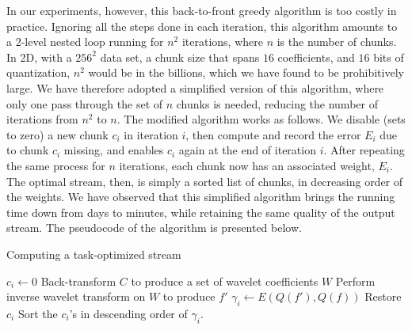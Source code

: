 In our experiments, however, this back-to-front greedy algorithm is too costly in practice. Ignoring
all the steps done in each iteration, this algorithm amounts to a 2-level nested loop running for
$n^2$ iterations, where $n$ is the number of chunks. In 2D, with a $256^2$ data set, a chunk size
that spans $16$ coefficients, and $16$ bits of quantization, $n^2$ would be in the billions, which
we have found to be prohibitively large. We have therefore adopted a simplified version of this
algorithm, where only one pass through the set of $n$ chunks is needed, reducing the number of
iterations from $n^2$ to $n$. The modified algorithm works as follows. We disable (sets to zero) a
new chunk $c_i$ in iteration $i$, then compute and record the error $E_i$ due to chunk $c_i$
missing, and enables $c_i$ again at the end of iteration $i$. After repeating the same process for
$n$ iterations, each chunk now has an associated weight, $E_i$. The optimal stream, then, is simply
a sorted list of chunks, in decreasing order of the weights. We have observed that this simplified
algorithm brings the running time down from days to minutes, while retaining the same quality of the
output stream. The pseudocode of the algorithm is presented below.

\begin{algorithm}[h]
  \caption{Computing a task-optimized stream}
  \begin{algorithmic}[1]
			\State $c_i \gets 0$
      \State Back-transform $C$ to produce a set of wavelet coefficients $W$
			\State Perform inverse wavelet transform on $W$ to produce $f'$
			\State $\gamma_i \gets E(Q(f'),Q(f))$			
			\State Restore $c_i$
		\EndFor
		\State Sort the $c_i$'s in descending order of $\gamma_i$.
	\end{algorithmic}
	\label{alg:greedy}
\end{algorithm}
